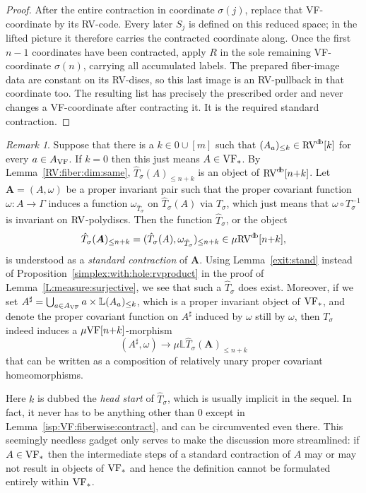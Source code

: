 \documentclass[12pt]{amsart}
\newcommand{\memph}[1]{{\color{magenta}\emph{#1}}}
\theoremstyle{plain}
\theoremstyle{definition}
\theoremstyle{remark}
\newtheorem{rem}[thm]{Remark}
\numberwithin{equation}{section}
\theoremstyle{plain}
\newcommand{\VF}{\textup{VF}}
\newcommand{\RV}{\textup{RV}}
\newcommand{\0}{\emptyset}
\newcommand{\bb}[1]{\mathbb{#1}}
\newcommand{\fun}{\longrightarrow}
\newcommand{\mVF}{{\mu}{\VF}}
\newcommand{\mRV}{{\mu}{\RV}}
\newcommand{\mL}{{\mu}{\bb L}}
\DeclareMathOperator{\db}{d \! b}
\begin{document}
\begin{proof}
After the entire contraction in coordinate $\sigma(j)$, replace that VF-coordinate by its RV-code. Every later $S_j$ is defined on this reduced space; in the lifted picture it therefore carries the contracted coordinate along. Once the first $n-1$ coordinates have been contracted, apply $R$ in the sole remaining VF-coordinate $\sigma(n)$, carrying all accumulated labels. The prepared fiber-image data are constant on its RV-discs, so this last image is an RV-pullback in that coordinate too. The resulting list has precisely the prescribed order and never changes a VF-coordinate after contracting it. It is the required standard contraction.
\end{proof}


\begin{rem}\label{stand:vol}
Suppose that there is a $k \in 0 \cup [m]$ such that  $(A_{a})_{\leq k} \in \RV^{\db}[k]$  for  every $a \in A_{\VF}$. If $k=0$ then this just means $A \in \VF_*$. By Lemma~\ref{RV:fiber:dim:same}, $\hat T_{\sigma}(A)_{\leq n+k}$ is an object of $\RV^{\db}[n{+}k]$. Let $\bm A = (A, \omega)$ be a proper invariant pair such that the proper covariant function $\omega : A \fun \Gamma$   induces a function $\omega_{\hat T_{\sigma}}$ on $\hat T_{\sigma}(A)$ via $T_{\sigma}$, which just means that $\omega \circ T^{-1}_{\sigma}$ is invariant on $\RV$-polydiscs. Then the function $\hat T_{\sigma}$, or the object
\[
\hat T_{\sigma}(\bm A)_{\leq n+k} = (\hat T_{\sigma}(A), \omega_{\hat T_{\sigma}})_{\leq n+k} \in \mRV^{\db}[n{+}k],
\]
is understood as  a \memph{standard contraction} of $\bm A$. Using Lemma~\ref{exit:stand} instead of Proposition~\ref{simplex:with:hole:rvproduct} in the proof of Lemma~\ref{L:measure:surjective}, we see that such a $\hat T_{\sigma}$ does exist. Moreover, if we set $A^\sharp = \bigcup_{a \in A_{\VF}} a \times \bb L (A_a)_{\leq k}$, which is a  proper invariant object of $\VF_*$, and denote the  proper covariant function on $A^\sharp$ induced by  $\omega$ still by $\omega$, then  $T_{\sigma}$  indeed induces a $\mVF[n{+}k]$-morphism
\[
(A^\sharp, \omega) \fun {\mL}\hat T_{\sigma}(\bm A)_{\leq n+k}
\]
that can be written as a composition of relatively unary proper covariant homeomorphisms.

Here $k$ is dubbed the \memph{head start} of $\hat T_{\sigma}$, which is usually implicit in the sequel. In fact,  it never has to be anything other than $0$ except in Lemma~\ref{isp:VF:fiberwise:contract}, and can be circumvented even there. This seemingly needless gadget only serves to make the discussion more streamlined: if $A \in \VF_*$ then the intermediate steps of a standard contraction of $A$ may or may not result in objects of $\VF_*$ and hence the definition cannot be formulated entirely within $\VF_*$.
\end{rem}
\end{document}
